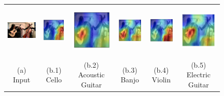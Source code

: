 \documentclass[12pt,a4paper]{article}
\begin{document}
\begin{figure}[t]
\centering

\begin{tabular}{cccccc}
\includegraphics[width=2.8cm, height=2.6cm]{Fig/fig1/guitar-cello.JPG}&
 \includegraphics[width=2cm]{Fig/fig1/BPZ/cello.png}&
 \includegraphics[width=2cm]{Fig/fig1/BPZ/acoustic-guitar.png}&
 \includegraphics[width=2cm]{Fig/fig1/BPZ/banjo.png}&
 \includegraphics[width=2cm]{Fig/fig1/BPZ/violin.png}&
 \includegraphics[width=2cm]{Fig/fig1/BPZ/electric-guitar.png}    \\
 {\scriptsize  (a) Input } & {\scriptsize  (b.1) Cello }  & {\scriptsize  (b.2) Acoustic Guitar }  &{\scriptsize  (b.3) Banjo} & {\scriptsize (b.4) Violin} & {\scriptsize  (b.5) Electric Guitar}   \\
\end{tabular}



\end{figure}
\end{document}
